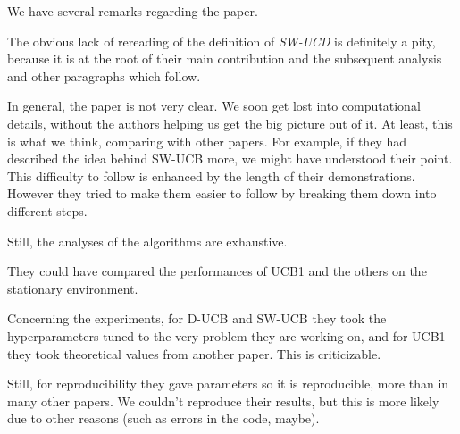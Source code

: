 We have several remarks regarding the paper.

The obvious lack of rereading of the definition of \textit{SW-UCD} is definitely a pity, because it is at the root of their main contribution and the subsequent analysis and other paragraphs which follow.

In general, the paper is not very clear. We soon get lost into computational details, without the authors helping us get the big picture out of it. At least, this is what we think, comparing with other papers. For example, if they had described the idea behind SW-UCB more, we might have understood their point.  This difficulty to follow is enhanced by the length of their demonstrations. However they tried to make them easier to follow by breaking them down into different steps.

Still, the analyses of the algorithms are exhaustive.

They could have compared the performances of UCB1 and the others on the stationary environment.

Concerning the experiments, for D-UCB and SW-UCB they took the hyperparameters tuned to the very problem they are working on, and for UCB1 they took theoretical values from another paper. This is criticizable. 

Still, for reproducibility they gave parameters so it is reproducible, more than in many other papers. We couldn't reproduce their results, but this is more likely due to other reasons (such as errors in the code, maybe).